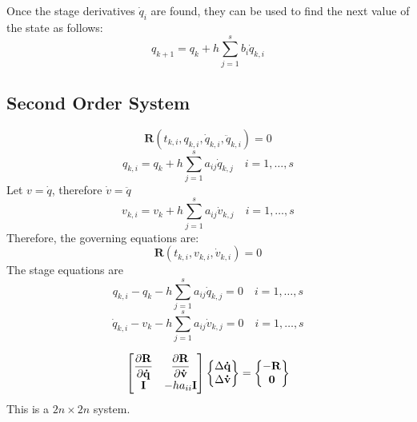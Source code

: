 \documentclass[pdftex,11pt,letter]{article}
\begin{document}
Once the stage derivatives $\dot{q}_{i}$ are found, they can be used
to find the next value of the state as follows:
\begin{equation}
  q_{k+1} = q_{k} +h \sum_{j=1}^s b_i \dot{q}_{k,i}
\end{equation}

\subsection{Second Order System}

\begin{equation}
  \mathbf{R}\left(t_{k,i}, q_{k,i}, \dot{q}_{k,i}, \ddot{q}_{k,i}\right) = 0
\end{equation}
\begin{equation}
  q_{k,i} = q_{k} + h \sum_{j=1}^s a_{ij} \dot{q}_{k,j} \quad i = 1,\ldots,s 
\end{equation}
Let $v=\dot{q}$, therefore $\dot{v}=\ddot{q}$
\begin{equation}
  v_{k,i} = v_{k} + h \sum_{j=1}^s a_{ij} \dot{v}_{k,j} \quad i = 1,\ldots,s 
\end{equation}
Therefore, the governing equations are:
\begin{equation}
  \mathbf{R}\left(t_{k,i}, v_{k,i}, \dot{v}_{k,i}\right) = 0
\end{equation}
The stage equations are
\begin{equation}
  q_{k,i} - q_{k} - h \sum_{j=1}^s a_{ij} \dot{q}_{k,j} = 0 \quad i = 1,\ldots,s 
\end{equation}
\begin{equation}
  \dot{q}_{k,i} - v_{k} - h \sum_{j=1}^s a_{ij} \dot{v}_{k,j} = 0 \quad i = 1,\ldots,s 
\end{equation}

\begin{equation}
  \begin{bmatrix}
    \mathbf{\dfrac{\partial R}{\partial \dot{q}}} & \mathbf{\dfrac{\partial R}{\partial \dot{v}}} \\
    \mathbf{I} & -h a_{ii}\mathbf{I}\\
  \end{bmatrix}   \begin{Bmatrix}
    \Delta{\mathbf{\dot{q}}} \\
    \Delta{\mathbf{\dot{v}}} \\
  \end{Bmatrix} =    \begin{Bmatrix}
    -\mathbf{R} \\ \mathbf{0}
  \end{Bmatrix}
\end{equation}
This is a $2n \times 2n$ system.
\end{document}
